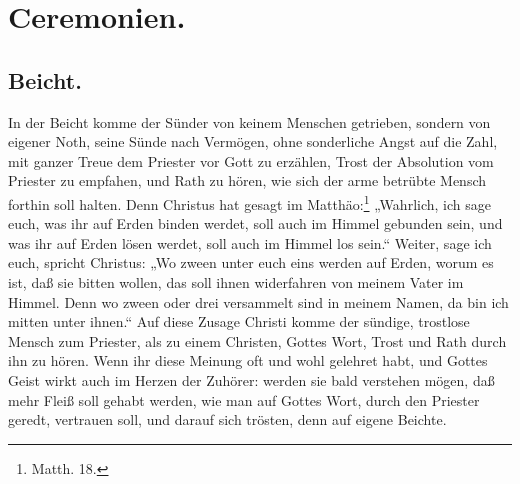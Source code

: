 \section*{Ceremonien.}

\subsection*{Beicht.}

In der Beicht komme der Sünder von keinem Menschen getrieben, sondern von eigener Noth, seine Sünde nach Vermögen, ohne sonderliche Angst auf die Zahl, mit ganzer Treue dem Priester vor Gott zu erzählen, Trost der Absolution vom Priester zu empfahen, und Rath zu hören, wie sich der arme betrübte Mensch forthin soll halten. Denn Christus hat gesagt im Matthäo:\footnote{Matth. 18.} „Wahrlich, ich sage euch, was ihr auf Erden binden werdet, soll auch im Himmel gebunden sein, und was ihr auf Erden lösen werdet, soll auch im Himmel los sein.“ Weiter, sage ich euch, spricht Christus: „Wo zween unter euch eins werden auf Erden, worum es ist, daß sie bitten wollen, das soll ihnen widerfahren von meinem Vater im Himmel. Denn wo zween oder drei versammelt sind in meinem Namen, da bin ich mitten unter ihnen.“ Auf diese Zusage Christi komme der sündige, trostlose Mensch zum Priester, als zu einem Christen, Gottes Wort, Trost und Rath durch ihn zu hören. Wenn ihr diese Meinung oft und wohl gelehret habt, und Gottes Geist wirkt auch im Herzen der Zuhörer: werden
sie bald verstehen mögen, daß mehr Fleiß soll gehabt werden, wie man auf Gottes Wort, durch den Priester geredt, vertrauen soll, und darauf sich trösten, denn auf eigene Beichte.

